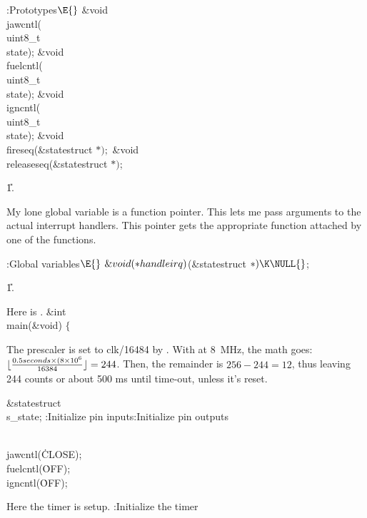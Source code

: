 \B{}:Prototypes\X${}\E{}$\6
\&{void} \\{jawcntl}(\\{uint8\_t}\\{state});\6
\&{void} \\{fuelcntl}(\\{uint8\_t}\\{state});\6
\&{void} \\{igncntl}(\\{uint8\_t}\\{state});\6
\&{void} \\{fireseq}(\&{statestruct} ${}{*});{}$\6
\&{void} \\{releaseseq}(\&{statestruct} ${}{*}){}$;\par
\U1.\fi

My lone global variable is a function pointer.
This lets me pass arguments to the actual interrupt handlers.
This pointer gets the appropriate function attached by one of the 
functions.

\Y\B\4:Global variables\X${}\E{}$\6
$\&{void}({*}\\{handleirq}){}$(\&{statestruct} ${}{*})\K\NULL{}$;\par
\U1.\fi

Here is .
\Y\B\&{int} \\{main}(\&{void})\1\1 $\{{}$\Y\par
\fi

The prescaler is set to clk/16484 by .
With  at 8~MHz, the math goes: $\lfloor{0.5 seconds \times (8 %
\times 10^6 \over 16384}\rfloor = 244$.
Then, the remainder is $256-244 = 12$, thus leaving 244 counts or about 500 ms
until time-out, unless it's reset.

\Y\B\&{statestruct} \\{s\_state}; :Initialize pin inputs\X{}:Initialize
pin outputs\X\par
\fi

\Y\B\\{jawcntl}(\.{CLOSE});\6
\\{fuelcntl}(\.{OFF});\6
\\{igncntl}(\.{OFF});\par
\fi

Here the timer is setup.
\Y\B{}:Initialize the timer\X\par
\fi

